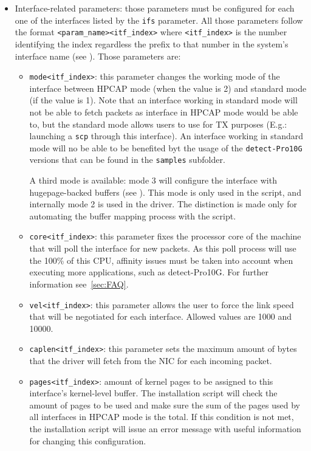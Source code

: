\documentclass[a4paper,oneside]{hpman}
\begin{document}
\begin{itemize}
    \item Interface-related parameters: those parameters must be configured for each one of the interfaces listed by the \texttt{ifs} parameter. All those parameters follow the format \texttt{<param\_name><itf\_index>} where \texttt{<itf\_index>} is the number identifying the index regardless the prefix to that number in the system's interface name (see ). Those parameters are:
    \begin{itemize}
        \item \texttt{mode<itf\_index>}: this parameter changes the working mode of the interface between HPCAP mode (when the value is 2) and standard mode (if the value is 1). Note that an interface working in standard mode will not be able to fetch packets as interface in HPCAP mode would be able to, but the standard mode allows users to use for TX purposes (E.g.: launching a \texttt{scp} through this interface). An interface working in standard mode will no be able to be benefited byt the usage of the \texttt{detect-Pro10G} versions that can be found in the \texttt{samples} subfolder.

        A third mode is available: mode 3 will configure the interface with hugepage-backed buffers (see ). This mode is only used in the script, and internally mode 2 is used in the driver. The distinction is made only for automating the buffer mapping process with the script.

        \item \texttt{core<itf\_index>}: this parameter fixes the processor core of the machine that will poll the interface for new packets. As this poll process will use the 100\% of this CPU, affinity issues must be taken into account when executing more applications, such as detect-Pro10G. For further information see~\ref{sec:FAQ}.

        \item \texttt{vel<itf\_index>}: this parameter allows the user to force the link speed that will be negotiated for each interface. Allowed values are 1000 and 10000.

        \item \texttt{caplen<itf\_index>}: this parameter sets the maximum amount of bytes that the driver will fetch from the NIC for each incoming packet.

        \item \texttt{pages<itf\_index>}: amount of kernel pages to be assigned to this interface's kernel-level buffer. The installation script will check the amount of pages to be used and make sure the sum of the pages used by all interfaces in HPCAP mode is the total. If this condition is not met, the installation script will issue an error message with useful information for changing this configuration.


\end{itemize}
\end{itemize}
\end{document}
